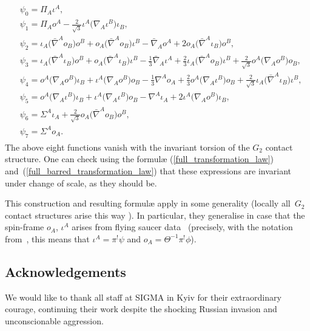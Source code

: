 \documentclass[10pt,a4paper]{amsart}
\numberwithin{equation}{section}
\begin{document}
\begin{gather*}
\begin{split}
&\psi_0 = \Pi_A\iota^A,\\
&\psi_1 = \textstyle
\Pi_Ao^A - \frac{2}{\sqrt{3}}\iota^A\big(\nabla_A\iota^B\big)\iota_B,\\
&\psi_2 = \iota_A\big(\bar{\nabla}^Ao_B\big)o^B + o_A\big(\bar{\nabla}^Ao_B\big)\iota^B
 - \bar{\nabla}_Ao^A + 2o_A\big(\bar{\nabla}^A\iota_B\big)o^B, \\
&\psi_3 = \textstyle\iota_A\big(\bar{\nabla}^A\iota_B\big)o^B
 + o_A\big(\bar{\nabla}^A\iota_B\big)\iota^B - \frac{1}{3}\bar{\nabla}_A\iota^A
 + \frac{2}{3}\iota_A\big(\bar{\nabla}^Ao_B\big)\iota^B
 + \frac{2}{\sqrt{3}}o^A\big(\nabla_Ao^B\big)o_B,\\
&\psi_4 = \textstyle
 o^A\big(\nabla_Ao^B\big)\iota_B + \iota^A\big(\nabla_Ao^B\big)o_B - \frac{1}{3}\nabla^Ao_A
 + \frac{2}{3}o^A\big(\nabla_A\iota^B\big)o_B
 + \frac{2}{\sqrt{3}}\iota_A\big(\bar{\nabla}^A\iota_B\big)\iota^B, \\
&\psi_5 =
 o^A\big(\nabla_A\iota^B\big)\iota_B + \iota^A\big(\nabla_A\iota^B\big)o_B
 - \nabla^A\iota_A + 2\iota^A\big(\nabla_Ao^B\big)\iota_B , \\
&\psi_6 = \textstyle \Sigma^A\iota_A + \frac{2}{\sqrt{3}}o_A\big(\bar{\nabla}^Ao_B\big)o^B,\\
&\psi_7 = \Sigma^Ao_A.
\end{split}
\end{gather*}
The above eight functions vanish with the invariant torsion of the $G_2$
contact structure. One can check using the formul{\ae}
(\ref{full_transformation_law}) and~(\ref{full_barred_transformation_law}) that
these expressions are invariant under change of scale, as they should be.

This construction and resulting formul{\ae} apply in some generality
(locally all~$G_2$ contact structures arise this way \cite{Moy}). In
particular, they generalise \cite[equation~(32)]{EN2} in case that the
spin-frame $o_A$, $\iota^A$ arises from flying saucer
data~\cite[equation~(24)]{EN2} (precisely, with the notation from~\cite{EN2},
this means that $\iota^A=\pi^!\psi$ and $o_A=\Theta^{-1}\pi^!\phi$).

\subsection*{Acknowledgements}

We would like to thank all staff at SIGMA in Kyiv for their extraordinary
courage, continuing their work despite the shocking Russian invasion and
unconscionable aggression.
\end{document}
